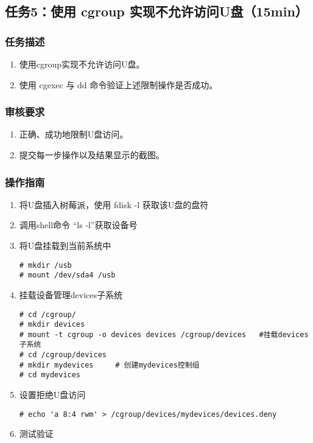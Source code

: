 \documentclass{article}
\begin{document}
\newpage
\subsection{任务5：使用 cgroup 实现不允许访问U盘（15min）}

\subsubsection{任务描述}
\begin{enumerate}
	\item 使用cgroup实现不允许访问U盘。
	\item 使用 cgexec 与 dd 命令验证上述限制操作是否成功。
\end{enumerate}

\subsubsection{审核要求}
\begin{enumerate}
	\item 正确、成功地限制U盘访问。
	\item 提交每一步操作以及结果显示的截图。
\end{enumerate}

\subsubsection{操作指南}
\begin{enumerate}
	\item 将U盘插入树莓派，使用 fdisk -l 获取该U盘的盘符
	\item 调用shell命令 “ls -l”获取设备号
	\item 将U盘挂载到当前系统中
	      \begin{lstlisting}
# mkdir /usb
# mount /dev/sda4 /usb
\end{lstlisting}
	\item 挂载设备管理devices子系统
	      \begin{lstlisting}
# cd /cgroup/
# mkdir devices
# mount -t cgroup -o devices devices /cgroup/devices   #挂载devices子系统
# cd /cgroup/devices
# mkdir mydevices     # 创建mydevices控制组
# cd mydevices
\end{lstlisting}
	\item 设置拒绝U盘访问
	      \begin{lstlisting}
# echo 'a 8:4 rwm' > /cgroup/devices/mydevices/devices.deny
\end{lstlisting}
	\item 测试验证
\end{enumerate}
\end{document}

